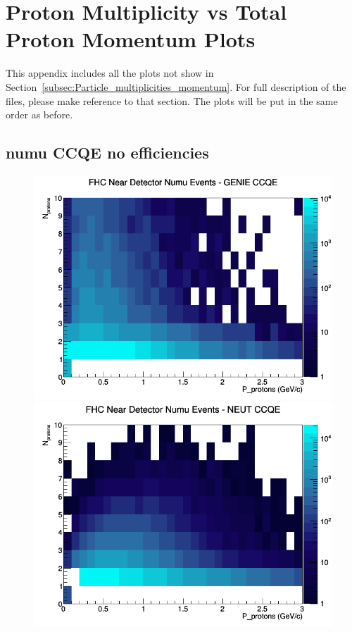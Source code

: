 \section{Proton Multiplicity vs Total Proton Momentum Plots}
\label{app:proton_multiplicity}
This appendix includes all the plots not show in Section~\ref{subsec:Particle_multiplicities_momentum}. For full description of the files, please make reference to that section. The plots will be put in the same order as before.
\subsection{numu CCQE no efficiencies}
\begin{figure}[h]
\includegraphics[width=\linewidth]{N_P/nominal/protons/CCQE_FHC_ND_numu_N_P_GENIE.png}
\endminipage
{}
\includegraphics[width=\linewidth]{N_P/nominal/protons/CCQE_FHC_ND_numu_N_P_NEUT.png}

\end{figure}
